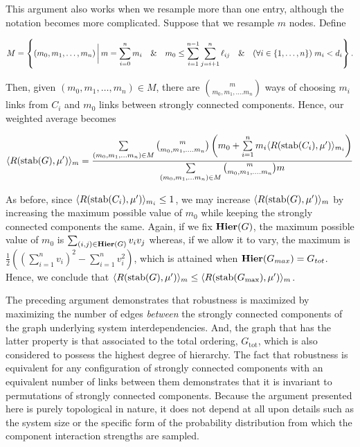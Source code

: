 This argument also works when we resample more than one entry,
although the notation becomes more complicated.  Suppose that we
resample $m$ nodes.  Define
\begin{widetext}
\begin{equation*}
M = \left\{(m_0, m_1, \ldots, m_n) \,\bigg|\,
m = \sum_{i=0}^n m_i \quad\&\quad
m_0 \le \sum_{i=1}^{n-1} \sum_{j=i+1}^n \ell_{ij} \quad\&\quad
(\forall i \in \{1, \ldots, n\}) \; m_i < d_i \right\}.
\end{equation*}
\end{widetext}
Then, given $(m_0, m_1, \ldots, m_n) \in M$, there are ${m \choose
m_0, m_1, \ldots. m_n}$ ways of choosing $m_i$ links from $C_i$ and
$m_0$ links between strongly connected components.  Hence, our
weighted average becomes
\begin{widetext}
\begin{equation}
\langle R(\hbox{stab} (G), \mu') \rangle_m =
\frac{\sum\limits_{(m_0, m_1, \ldots m_n) \in M}
      {m \choose m_0, m_1, \ldots. m_n}
      \left(m_0 + \sum\limits_{i=1}^n m_i \langle R(\hbox{stab} (C_i), \mu') \rangle_{m_i} \right)}
     {\sum\limits_{(m_0, m_1, \ldots m_n) \in M}
      {m \choose m_0, m_1, \ldots. m_n} m}
\end{equation}
\end{widetext}

As before, since $\langle R(\hbox{stab} (C_i), \mu') \rangle_{m_i} \le 1$, we may
increase $\langle R(\hbox{stab} (G), \mu') \rangle_m$ by increasing the maximum
possible value of $m_0$ while keeping the strongly connected
components the same.  Again, if we fix $\mathbf{Hier}(G)$, the maximum
possible value of $m_0$ is $\sum_{(i,j) \in \mathbf{Hier}(G)} v_i v_j$
whereas, if we allow it to vary, the maximum is $\frac{1}{2} ((\sum_{i=1}^n
v_i)^2 - \sum_{i=1}^n v_i^2)$, which is attained when $\mathbf{Hier}(G_{max}) =
G_{tot}$.  Hence, we conclude that $\langle R(\hbox{stab} (G), \mu') \rangle_m \le
\langle R(\hbox{stab} (G_{\mathrm{max}}), \mu') \rangle_m$.

The preceding argument demonstrates that robustness is
maximized by maximizing the number of edges \emph{between} the strongly
connected components of the graph underlying system interdependencies.
And, the graph that has the latter property is that associated to the total
ordering, $G_{\mathrm{tot}}$, which is also considered to possess the highest degree of hierarchy. The fact that robustness is equivalent for any configuration of strongly connected components with an equivalent number of links between them demonstrates that it is invariant to permutations of
strongly connected components. Because the argument presented here is purely topological in nature, it does not depend at all upon details such as the system size or the specific form of the probability distribution from which the component interaction strengths are sampled.
